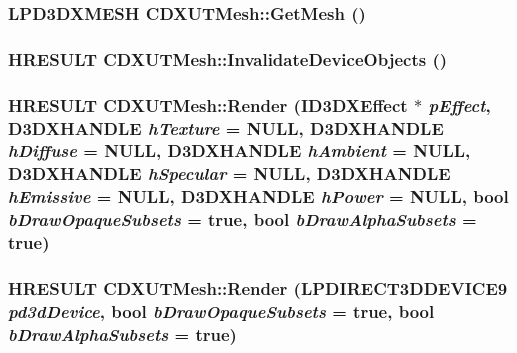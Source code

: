 \label{class_c_d_x_u_t_mesh_ac19a8633a52a8075495c315e39c22c51}
\hypertarget{class_c_d_x_u_t_mesh_af6138b3d68265bce510ec4bf958c8d55}{
\subsubsection[{GetMesh}]{\setlength{\rightskip}{0pt plus 5cm}LPD3DXMESH CDXUTMesh::GetMesh ()}}
\label{class_c_d_x_u_t_mesh_af6138b3d68265bce510ec4bf958c8d55}
\hypertarget{class_c_d_x_u_t_mesh_a1ffb2e6d24e4bc0dfc053e15c4264eac}{
\subsubsection[{InvalidateDeviceObjects}]{\setlength{\rightskip}{0pt plus 5cm}HRESULT CDXUTMesh::InvalidateDeviceObjects ()}}
\label{class_c_d_x_u_t_mesh_a1ffb2e6d24e4bc0dfc053e15c4264eac}
\hypertarget{class_c_d_x_u_t_mesh_a49f40ac0f3c696648d1624031de6e69e}{
\subsubsection[{Render}]{\setlength{\rightskip}{0pt plus 5cm}HRESULT CDXUTMesh::Render (ID3DXEffect $\ast$ {\em pEffect}, \/  D3DXHANDLE {\em hTexture} = {\ttfamily NULL}, \/  D3DXHANDLE {\em hDiffuse} = {\ttfamily NULL}, \/  D3DXHANDLE {\em hAmbient} = {\ttfamily NULL}, \/  D3DXHANDLE {\em hSpecular} = {\ttfamily NULL}, \/  D3DXHANDLE {\em hEmissive} = {\ttfamily NULL}, \/  D3DXHANDLE {\em hPower} = {\ttfamily NULL}, \/  bool {\em bDrawOpaqueSubsets} = {\ttfamily true}, \/  bool {\em bDrawAlphaSubsets} = {\ttfamily true})}}
\label{class_c_d_x_u_t_mesh_a49f40ac0f3c696648d1624031de6e69e}
\hypertarget{class_c_d_x_u_t_mesh_a55ce28dfc8c207496925bf757819b4dd}{
\subsubsection[{Render}]{\setlength{\rightskip}{0pt plus 5cm}HRESULT CDXUTMesh::Render (LPDIRECT3DDEVICE9 {\em pd3dDevice}, \/  bool {\em bDrawOpaqueSubsets} = {\ttfamily true}, \/  bool {\em bDrawAlphaSubsets} = {\ttfamily true})}}
